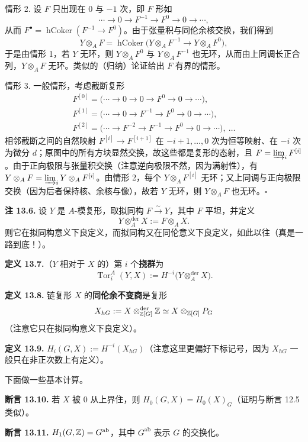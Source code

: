 情形 2. 设 $F$ 只出现在 $0$ 与 $-1$ 次，即 $F$ 形如
\[
\cdots\to 0\to F^{-1}\to F^{0}\to 0\to\cdots,
\]
从而 $F^{\bullet}=\operatorname{hCoker}(F^{-1}\to F^{0})$。由于张量积与同伦余核交换，我们得到
\[
Y\otimes_{A}F=\operatorname{hCoker}\bigl(Y\otimes_{A}F^{-1}\to Y\otimes_{A}F^{0}\bigr),
\]
于是由情形 1，若 $Y$ 无环，则 $Y\otimes_{A}F^{0}$ 与 $Y\otimes_{A}F^{-1}$ 也无环，从而由上同调长正合列，$Y\otimes_{A}F$ 无环。类似的（归纳）论证给出 $F$ 有界的情形。

情形 3. 一般情形，考虑截断复形
\[
\begin{array}{l}
F^{[0]}=\bigl(\cdots\to 0\to 0\to F^{0}\to 0\to\cdots\bigr),\\[2pt]
F^{[1]}=\bigl(\cdots\to 0\to F^{-1}\to F^{0}\to 0\to\cdots\bigr),\\[2pt]
F^{[2]}=\bigl(\cdots\to F^{-2}\to F^{-1}\to F^{0}\to 0\to\cdots\bigr),\ \dots
\end{array}
\]
相邻截断之间的自然映射 $F^{[i]}\to F^{[i+1]}$ 在 $-i+1,\dots,0$ 次为恒等映射、在 $-i$ 次为微分 $d$；原图中的所有方块显然交换，故这些都是复形的态射，且 $F=\varinjlim_{i}F^{[i]}$。由于正向极限与张量积交换（注意逆向极限不然，因为满射性），有 $Y\otimes_{A}F=\varinjlim_{i}Y\otimes_{A}F^{[i]}$。由情形 2，每个 $Y\otimes_{A}F^{[i]}$ 无环；又上同调与正向极限交换（因为后者保持核、余核与像），故若 $Y$ 无环，则 $Y\otimes_{A}F$ 也无环。\hfill$\square$

\textbf{注 13.6.} 设 $Y$ 是 $A$-模复形，取拟同构 $F\xrightarrow{\ \sim\ }Y$，其中 $F$ 平坦，并定义
\[
Y\otimes_{A}^{\mathrm{der}}X:=F\otimes_{A}X.
\]
则它在拟同构意义下良定义，而拟同构又在同伦意义下良定义，如此以往（真是一路到底！）。

\textbf{定义 13.7.}（$Y$ 相对于 $X$ 的）第 $i$ 个\textbf{挠群}为
\[
\operatorname{Tor}_{i}^{A}(Y,X):=H^{-i}\bigl(Y\otimes_{A}^{\mathrm{der}}X\bigr).
\]

\textbf{定义 13.8.} 链复形 $X$ 的\textbf{同伦余不变商}是复形
\[
X_{hG}:=X\otimes_{\mathbb{Z}[G]}^{\mathrm{der}}\mathbb{Z}\simeq X\otimes_{\mathbb{Z}[G]}P_{G}
\]
（注意它只在拟同构意义下良定义）。

\textbf{定义 13.9.} $H_{i}(G,X):=H^{-i}(X_{hG})$（注意这里更偏好下标记号，因为 $X_{hG}$ 一般只在非正次数上有定义）。

下面做一些基本计算。

\textbf{断言 13.10.} 若 $X$ 被 $0$ 从上界住，则 $H_{0}(G,X)=H_{0}(X)_{G}$（证明与断言 12.5 类似）。

\textbf{断言 13.11.} $H_{1}(G,\mathbb{Z})=G^{\mathrm{ab}}$，其中 $G^{\mathrm{ab}}$ 表示 $G$ 的交换化。

